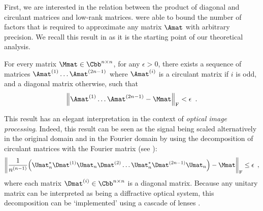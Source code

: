 First, we are interested in the relation between the product of diagonal and circulant matrices and low-rank matrices.
\citet{huhtanen2015factoring} were able to bound the number of factors that is required to approximate any matrix $\Amat$ with arbitrary precision.
We recall this result in  as it is the starting point of our theoretical analysis.

\begin{theorem} \label{theorem:ch4-huhtanen}
  For every matrix $\Mmat \in \Cnn$, for any $\epsilon > 0$, there exists a sequence of matrices $\Amat^{(1)} \ldots \Amat^{(2n-1)}$ where $\Amat^{(i)}$ is a circulant matrix if $i$ is odd, and a diagonal matrix otherwise, such that
  \begin{equation}
    \norm{\Amat^{(1)} \ldots \Amat^{(2n-1)} - \Mmat}_\fro < \epsilon \enspace.
  \end{equation}
  \removespace
\end{theorem}

This result has an elegant interpretation in the context of \emph{optical image processing}.
Indeed, this result can be seen as the signal being scaled alternatively in the original domain and in the Fourier domain by using the decomposition of circulant matrices with the Fourier matrix (see ):
\begin{equation}
  \norm{ \frac{1}{n^{(n-1)}} \left( \Umat_n^* \Dmat^{(1)} \Umat_n \Dmat^{(2)} \dots \Umat_n^* \Dmat^{(2n-1)} \Umat_n \right) - \Mmat}_\fro \leq \epsilon \enspace,
\end{equation}
where each matrix $\Dmat^{(i)} \in \Cbb^{n \times n}$ is a diagonal matrix.
Because any unitary matrix can be interpreted as being a diffractive optical system, this decomposition can be `implemented' using a cascade of lenses \cite{muller1998algorithmic}.






